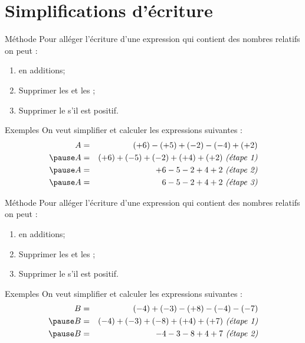 \documentclass[xcolor={dvipsnames}]{beamer}
\begin{document}
\section{Simplifications d'écriture}

\begin{frame}
	\begin{block}{Méthode}
			Pour alléger l'écriture d'une expression qui contient des nombres relatifs on peut :\pause
		\begin{enumerate}
			\item {} en additions; \pause
			\item Supprimer les  et les ; \pause
			\item Supprimer le  s'il est positif.
		\end{enumerate}
	\end{block}
	
	
	\begin{exampleblock}{Exemples}
		On veut simplifier et calculer les expressions suivantes :
		\begin{eqnarray*}
			A &=& (+6) - (+5) + (-2) - (-4) + (+2)\\ \pause
			A &=& (+6) + (-5) + (-2) + (+4) + (+2)  \text{  \textit{(étape 1)}} \\ \pause
			A &=& +6  -5  -2  +4  +2 \text{  \textit{(étape 2)}}\\ \pause
			A &=& 6  -5  -2  +4  +2 \text{  \textit{(étape 3)}}
		\end{eqnarray*}
	\end{exampleblock}

	
	
\end{frame}	


\begin{frame}
	\begin{block}{Méthode}
		Pour alléger l'écriture d'une expression qui contient des nombres relatifs on peut :
		\begin{enumerate}
			\item {} en additions; 
			\item Supprimer les  et les ; 
			\item Supprimer le  s'il est positif.
		\end{enumerate}
	\end{block}
	
	
	\begin{exampleblock}{Exemples}
		On veut simplifier et calculer les expressions suivantes :
		\begin{eqnarray*}
			B &=& (-4) + (-3) - (+8) - (-4) - (-7)\\ \pause
			B &=& (-4) + (-3) + (-8) + (+4) + (+7) \text{  \textit{(étape 1)}}\\ \pause
			B &=& -4  -3  -8  +4  +7 \text{  \textit{(étape 2)}}
		\end{eqnarray*}
	\end{exampleblock}
	
\end{frame}	
\end{document}
